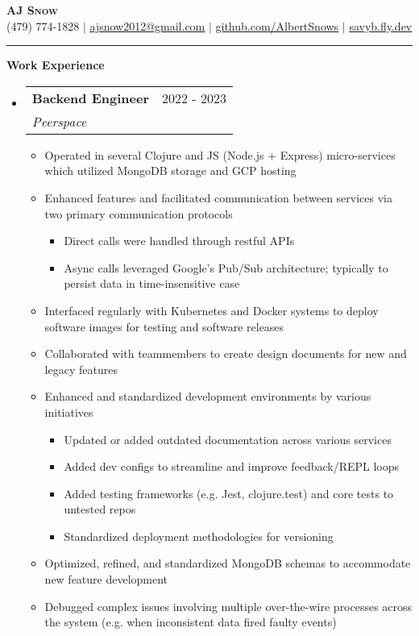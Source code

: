 \documentclass[letterpaper,11pt]{article}
\makeatletter
\newcommand{\resumeItem}[1]{
  \item\small{
    {#1 \vspace{-2pt}}
  }
}
\newcommand{\resumeSubheading}[4]{
  \vspace{-2pt}\item
    \begin{tabular*}{0.97\textwidth}[t]{l@{\extracolsep{\fill}}r}
      \textbf{#1} & #2 \\
      \textit{\small#3} & \textit{\small #4} \\
    \end{tabular*}\vspace{0pt}
}
\newcommand{\resumeSubHeadingListStart}{\begin{itemize}[leftmargin=0.15cm, label={}]}
\newcommand{\resumeSubHeadingListEnd}{\end{itemize}}
\newcommand{\resumeItemListStart}{\begin{itemize}}
\newcommand{\resumeItemListEnd}{\end{itemize}\vspace{-5pt}}
\makeatother
\begin{document}
\textbf{\scshape \Large \textcolor{magic_blue}{AJ Snow}} \\ \vspace{3pt}
\small (479) 774-1828 $|$ \href{mailto:ajsnow2012@gmail.com}
{\underline{ajsnow2012@gmail.com}} $|$
\href{https://github.com/AlbertSnows}{\underline{github.com/AlbertSnows}}
$|$ \href{https://savyb.fly.dev/}{\underline{savyb.fly.dev}}
\noindent\rule{19.5cm}{0.4pt}

\textbf{\large \textcolor{magic_blue}{Work Experience}}
\resumeSubHeadingListStart
\resumeSubheading
{Backend Engineer}{2022 - 2023}
{Peerspace}{}
\resumeItemListStart
\resumeItem{Operated in several Clojure and JS (Node.js + Express) micro-services which utilized MongoDB storage and GCP hosting}
\resumeItem{Enhanced features and facilitated communication between services via two primary communication protocols}
\begin{itemize}
    \item Direct calls were handled through restful APIs
    \item Async calls leveraged Google's Pub/Sub architecture; typically to persist data in time-insensitive case
\end{itemize}
\resumeItem{Interfaced regularly with Kubernetes and Docker systems to deploy software images for testing and software releases}
\resumeItem{Collaborated with teammembers to create design documents for new and legacy features}
\resumeItem{Enhanced and standardized development environments by various initiatives}
\begin{itemize}
    \item Updated or added outdated documentation across various services
    \item Added dev configs to streamline and improve feedback/REPL loops
    \item Added testing frameworks (e.g. Jest, clojure.test) and core tests to untested repos
    \item Standardized deployment methodologies for versioning
\end{itemize}
\resumeItem{Optimized, refined, and standardized MongoDB schemas to accommodate new feature development}
\resumeItem{Debugged complex issues involving multiple over-the-wire processes across the system (e.g. when inconsistent data fired faulty events) }
\resumeItemListEnd
\resumeSubHeadingListEnd
\end{document}

